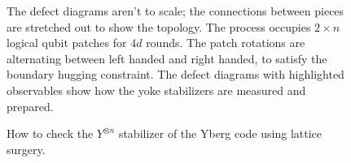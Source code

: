 \documentclass[onecolumn,unpublished,a4paper]{quantumarticle}
\theoremstyle{definition}
\theoremstyle{definition}
\theoremstyle{definition}
\begin{document}
\begin{figure}[h]
{        The defect diagrams aren't to scale; the connections between pieces are stretched out to show the topology.
        The process occupies $2 \times n$ logical qubit patches for $4d$ rounds.
        The patch rotations are alternating between left handed and right handed, to satisfy the boundary hugging constraint.
        The defect diagrams with highlighted observables show how the yoke stabilizers are measured and prepared.
    }
    \label{fig:iceberg_check}
\end{figure}

\begin{figure}[h]
    \centering
    \caption{
        How to check the $Y^{\otimes n}$ stabilizer of the Yberg code using lattice surgery.
}
\end{figure}
\end{document}
